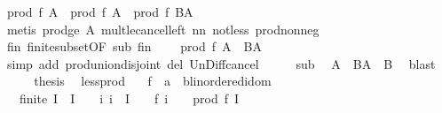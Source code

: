 \begin{isabellebody}
\ {\isachardoublequoteopen}prod\ f\ A\ {\isasymle}\ prod\ f\ A\ {\isacharasterisk}{\kern0pt}\ prod\ f\ {\isacharparenleft}{\kern0pt}B{\isacharminus}{\kern0pt}A{\isacharparenright}{\kern0pt}{\isachardoublequoteclose}\isanewline
\ \ \ \ \isamarkupfalse%
\ {\isacharparenleft}{\kern0pt}metis\ prod{\isacharunderscore}{\kern0pt}ge{\isacharunderscore}{\kern0pt}{}\ A\ mult{\isacharunderscore}{\kern0pt}le{\isacharunderscore}{\kern0pt}cancel{\isacharunderscore}{\kern0pt}left{}\ nn\ not{\isacharunderscore}{\kern0pt}less\ prod{\isacharunderscore}{\kern0pt}nonneg{\isacharparenright}{\kern0pt}\isanewline
\ \ \isamarkupfalse%
\ \isamarkupfalse%
\ fin\ finite{\isacharunderscore}{\kern0pt}subset{\isacharbrackleft}{\kern0pt}OF\ sub\ fin{\isacharbrackright}{\kern0pt}\ \isamarkupfalse%
\ {\isachardoublequoteopen}{\isasymdots}\ {\isacharequal}{\kern0pt}\ prod\ f\ {\isacharparenleft}{\kern0pt}A\ {\isasymunion}\ {\isacharparenleft}{\kern0pt}B{\isacharminus}{\kern0pt}A{\isacharparenright}{\kern0pt}{\isacharparenright}{\kern0pt}{\isachardoublequoteclose}\isanewline
\ \ \ \ \isamarkupfalse%
\ {\isacharparenleft}{\kern0pt}simp\ add{\isacharcolon}{\kern0pt}\ prod{\isachardot}{\kern0pt}union{\isacharunderscore}{\kern0pt}disjoint\ del{\isacharcolon}{\kern0pt}\ Un{\isacharunderscore}{\kern0pt}Diff{\isacharunderscore}{\kern0pt}cancel{\isacharparenright}{\kern0pt}\isanewline
\ \ \isamarkupfalse%
\ \isamarkupfalse%
\ sub\ \isamarkupfalse%
\ {\isachardoublequoteopen}A\ {\isasymunion}\ {\isacharparenleft}{\kern0pt}B{\isacharminus}{\kern0pt}A{\isacharparenright}{\kern0pt}\ {\isacharequal}{\kern0pt}\ B{\isachardoublequoteclose}\ \isamarkupfalse%
\ blast\isanewline
\ \ \isamarkupfalse%
\ \isamarkupfalse%
\ {\isacharquery}{\kern0pt}thesis\ \isacommand{{\isachardot}{\kern0pt}}\isamarkupfalse%
\isanewline
{}\isamarkupfalse%
%
\endisatagproof
{\isafoldproof}%
%
\isadelimproof
\isanewline
%
\endisadelimproof
\isanewline
{}\isamarkupfalse%
\ less{\isacharunderscore}{\kern0pt}{}{\isacharunderscore}{\kern0pt}prod{\isacharcolon}{\kern0pt}\isanewline
\ \ \ f\ {\isacharcolon}{\kern0pt}{\isacharcolon}{\kern0pt}\ {\isachardoublequoteopen}{\isacharprime}{\kern0pt}a\ {\isasymRightarrow}\ {\isacharprime}{\kern0pt}b{\isacharcolon}{\kern0pt}{\isacharcolon}{\kern0pt}linordered{\isacharunderscore}{\kern0pt}idom{\isachardoublequoteclose}\isanewline
\ \ \ {\isachardoublequoteopen}finite\ I\ {\isasymLongrightarrow}\ I\ {\isasymnoteq}\ {\isacharbraceleft}{\kern0pt}{\isacharbraceright}{\kern0pt}\ {\isasymLongrightarrow}\ {\isacharparenleft}{\kern0pt}{\isasymAnd}i{\isachardot}{\kern0pt}\ i\ {\isasymin}\ I\ {\isasymLongrightarrow}\ {}\ {\isacharless}{\kern0pt}\ f\ i{\isacharparenright}{\kern0pt}\ {\isasymLongrightarrow}\ {}\ {\isacharless}{\kern0pt}\ prod\ f\ I{\isachardoublequoteclose}\isanewline

\end{isabellebody}
